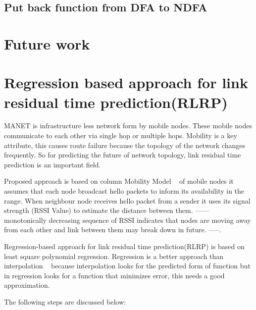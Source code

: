 \documentclass[runningheads]{llncs}
\begin{document}
	\subsection{Put back function from DFA to NDFA}
	
	\section{Future work}
	
	
	
	
	
	
	\iffalse
	\section{Regression based approach for link residual time prediction(RLRP)}
	MANET is infrastructure less network form by mobile nodes. These mobile nodes communicate to each other via single hop or multiple hops. Mobility is a key attribute, this causes route failure because the topology of the network changes frequently. So for predicting the future of network topology, link residual time prediction is an important field.
	\par 
	Proposed approach is based on column Mobility Model ~\cite{r15} of mobile nodes it assumes that each node broadcast hello packets to inform its availability in the range. When neighbour node receives hello packet from a sender it uses its signal strength (RSSI Value) to estimate the distance between them.
	------
	monotonically decreasing sequence of RSSI indicates that nodes are moving away from each other and link between them may break down in future. -----.
	\par
	Regression-based approach for link residual time prediction(RLRP) is based on least square polynomial regression. Regression is a better approach than interpolation ~\cite{r16} because interpolation looks for the predicted form of function but in regression looks for a function that minimizes error, this needs a good approximation. 
	
	The following steps are discussed below: 
	
\end{document}
